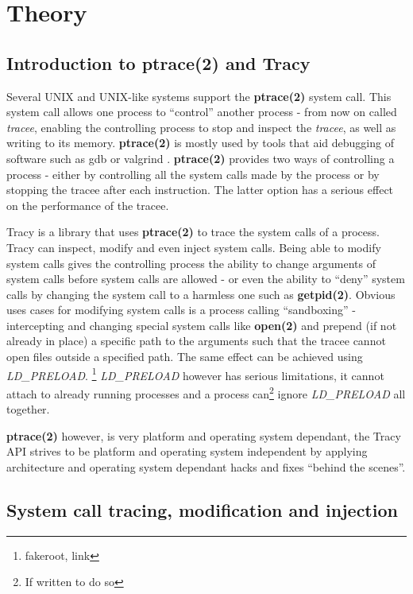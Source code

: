 \documentclass[a4paper, twoside, 10pt, twocolumn]{report}
\begin{document}
\chapter{Theory}

\section{Introduction to ptrace(2) and Tracy}

Several UNIX and UNIX-like systems support the \textbf{ptrace(2)} system call.
This system call allows one process to ``control'' another process - from now on
called \textit{tracee}, enabling the controlling process to stop and inspect
the \textit{tracee}, as well as writing to its memory. \textbf{ptrace(2)} is
mostly used by tools that aid debugging of software such as gdb\cite{} or
valgrind \cite{}. \textbf{ptrace(2)} provides two ways of controlling a process
- either by controlling all the system calls made by the process or by stopping
the tracee after each instruction. The latter option has a serious effect on the
performance of the tracee.

Tracy is a library that uses \textbf{ptrace(2)} to trace the system calls of a
process. Tracy can inspect, modify and even inject system calls. Being able to
modify system calls gives the controlling process the ability to change
arguments of system calls before system calls are allowed - or even the ability
to ``deny'' system calls by changing the system call to a harmless one such as
\textbf{getpid(2)}. Obvious uses cases for modifying system calls is a process
calling ``sandboxing'' - intercepting and changing special system calls like
\textbf{open(2)} and prepend (if not already in place) a specific path to the
arguments such that the tracee cannot open files outside a specified path.
The same effect can be achieved using \textit{LD\_PRELOAD}. \footnote{fakeroot,
link} \textit{LD\_PRELOAD} however has serious limitations, it cannot attach to
already running processes and a process can\footnote{If written to do so} ignore
\textit{LD\_PRELOAD} all together.

\textbf{ptrace(2)} however, is very platform and operating system dependant,
the Tracy API strives to be platform and operating system independent by
applying architecture and operating system dependant hacks and fixes
``behind the scenes''.

\section{System call tracing, modification and injection}
\end{document}

